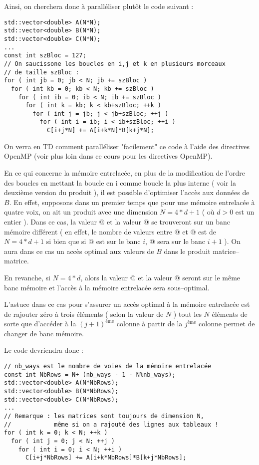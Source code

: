 \documentclass[fleqn,11pt]{article}
\begin{document}
Ainsi, on cherchera donc à paralléliser plutôt le code suivant :
\begin{lstlisting}
std::vector<double> A(N*N);
std::vector<double> B(N*N);
std::vector<double> C(N*N);
...
const int szBloc = 127;
// On saucissone les boucles en i,j et k en plusieurs morceaux 
// de taille szBloc :
for ( int jb = 0; jb < N; jb += szBloc )
  for ( int kb = 0; kb < N; kb += szBloc )
    for ( int ib = 0; ib < N; ib += szBloc )
      for ( int k = kb; k < kb+szBloc; ++k )
        for ( int j = jb; j < jb+szBloc; ++j )
          for ( int i = ib; i < ib+szBloc; ++i )
            C[i+j*N] += A[i+k*N]*B[k+j*N];
\end{lstlisting}

On verra en TD comment paralléliser "facilement" ce code à l'aide des directives OpenMP (voir plus loin dans ce cours pour les directives OpenMP).

En ce qui concerne la mémoire entrelacée, en plus de la modification de l'ordre des boucles en mettant la boucle en i comme boucle la plus interne ( voir la deuxième version du produit ), 
il est possible d'optimiser l'accès aux données de $B$. En effet, supposons dans un premier temps
que pour une mémoire entrelacée à quatre voix, on ait un produit avec une dimension $N=4*d+1$ ( où $d>0$ est un entier ).
Dans ce cas, la valeur \lstinline@B[k+j*N]@ et la valeur \lstinline@B[k+(j+1)*N]@ se trouveront sur un banc mémoire différent ( en effet, le nombre de valeurs entre  \lstinline@B[k+j*N]@ et \lstinline@B[k+(j+1)*N]@ est de $N=4*d+1$ si bien que si \lstinline@B[k+j*N]@ est sur le banc $i$, \lstinline@B[k+(j+1)*N]@ sera sur le banc $i+1$ ). On aura dans ce cas un accès optimal aux valeurs de $B$ dans le produit matrice--matrice.

En revanche, si $N=4*d$, alors la valeur \lstinline@B[k+j*N]@ et la valeur \lstinline@B[k+(j+1)*N]@ seront sur le même banc mémoire et l'accès à la mémoire entrelacée sera sous--optimal.

L'astuce dans ce cas pour s'assurer un accès optimal à la mémoire entrelacée est de rajouter zéro à trois éléments ( selon la valeur de $N$ ) tout les $N$ éléments de sorte que d'accéder à la $(j+1)^{\mbox{ème}}$ colonne à partir de la  $j^{\mbox{ème}}$ colonne permet de changer de banc mémoire.

Le code devriendra donc :
\begin{lstlisting}
// nb_ways est le nombre de voies de la mémoire entrelacée
const int NbRows = N+ (nb_ways - 1 - N%nb_ways);
std::vector<double> A(N*NbRows);
std::vector<double> B(N*NbRows);
std::vector<double> C(N*NbRows);
...
// Remarque : les matrices sont toujours de dimension N,
//            même si on a rajouté des lignes aux tableaux !
for ( int k = 0; k < N; ++k )
  for ( int j = 0; j < N; ++j )
    for ( int i = 0; i < N; ++i )
      C[i+j*NbRows] += A[i+k*NbRows]*B[k+j*NbRows];
\end{lstlisting}
\end{document}
